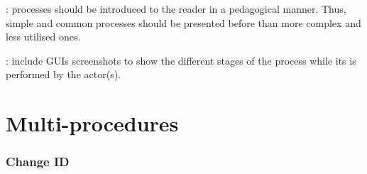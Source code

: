: processes should be introduced to the
reader in a pedagogical manner. Thus, simple and common processes should be presented before
than more complex and less utilised ones.

: include GUIs screenshots to show the
different stages of the process while its is performed by the actor(s).






\section{Multi-procedures}


\subsubsection{Change ID}


